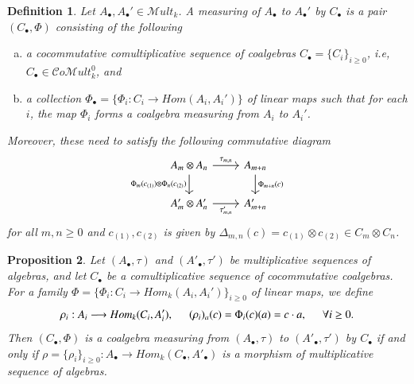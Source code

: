 \documentclass[10pt, colorlinks]{article}
\numberwithin{equation}{section} \DeclareMathSizes{2}{10}{12}{13}
\newtheorem{thm}{Proposition}[section]
\newtheorem{defn}[thm]{Definition}
\begin{document}
       

        
       \iffalse
        \begin{defn}
            Let $A_\bullet,A_\bullet'\in \mathscr Mult_k$. A measuring of $A_\bullet$ to $A_\bullet'$ by $C_\bullet$ is a pair $(C_\bullet,\Phi)$ consisting of the following
            \begin{enumerate}[(a)]
                \item a cocommutative comultiplicative sequence of coalgebras $C_\bullet=\{C_i\}_{i\geq 0}$, i.e, $C_\bullet\in \mathcal Co\mathscr Mult_k^0$, and
                \item a collection $\Phi_\bullet=\{\Phi_i:C_i\longrightarrow  {Hom}(A_i,A_i')\}$ of linear maps such that for each $i$, the map $\Phi_i$ forms a coalgebra measuring from $A_i$ to $A_i'$.
            \end{enumerate}
            Moreover, these need to satisfy the following commutative diagram
            \begin{equation}\label{diag6.4}
                \begin{tikzcd}
                A_m \otimes A_n
                \arrow[r, "\tau_{m,n}"]
                \arrow[d, "\Phi_m(c_{(1)})\otimes\Phi_{n}(c_{(2)})"']
                &A_{m+n}
                \arrow[d, "\Phi_{m+n}(c)"]\\
                A_m'\otimes A_{n}' \arrow[r, "\tau_{m,n}'"']
                &A'_{m+n}
            \end{tikzcd}
            \end{equation}
            for all $m,n\geq 0$ and $c_{(1)},c_{(2)}$ is given by $\Delta_{m,n}(c)=c_{(1)}\otimes c_{(2)}\in C_m\otimes C_n$.
        \end{defn}
        \begin{thm}
        Let $(A_\bullet,\tau)$ and $(A'_\bullet,\tau')$ be multiplicative sequences of algebras, and let $C_\bullet$ be a comultiplicative sequence of cocommutative coalgebras. For a family $\Phi=\{\Phi_i:C_i\longrightarrow  {Hom}_k(A_i,A_i')\}_{i\geq 0}$ of linear maps, we define 
        \begin{equation}\label{eq6.5}
        \rho_i:A_i\longrightarrow  {Hom}_k(C_i, A'_i),\hspace{.5cm}(\rho_i)_a(c)=\Phi_i(c)(a)=c\cdot a,\hspace{.5cm}\forall i\geq0.
    \end{equation}
    Then $(C_\bullet,\Phi)$ is a coalgebra measuring from $(A_\bullet,\tau)$ to $(A'_\bullet,\tau')$ by $C_\bullet$ if and only if $\rho=\{\rho_i\}_{i\geq0}: A_\bullet\longrightarrow  {Hom}_k(C_\bullet, A'_\bullet)$ is a morphism of multiplicative sequence of algebras.
    \end{thm}
\end{document}
